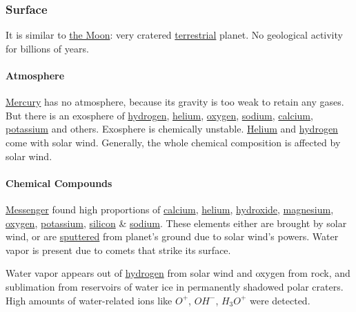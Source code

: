 \subsubsection{Surface}
It is similar to \hyperref[planet:earth:moon]{the Moon}: very cratered
\href{https://en.wikipedia.org/wiki/Terrestrial_planet}{terrestrial} planet. No
geological activity for billions of years.
\paragraph{Atmosphere}
\hyperref[planet:mercury]{Mercury} has no atmosphere, because its gravity is too
weak to retain any gases. But there is an exosphere of
\href{https://en.wikipedia.org/wiki/Hydrogen}{hydrogen},
\href{https://en.wikipedia.org/wiki/Helium}{helium},
\href{https://en.wikipedia.org/wiki/Oxygen}{oxygen},
\href{https://en.wikipedia.org/wiki/Sodium}{sodium},
\href{https://en.wikipedia.org/wiki/Calcium}{calcium},
\href{https://en.wikipedia.org/wiki/Potassium}{potassium} and others. Exosphere
is chemically unstable. \href{https://en.wikipedia.org/wiki/Helium}{Helium} and
\href{https://en.wikipedia.org/wiki/Hydrogen}{hydrogen} come with solar wind.
Generally, the whole chemical composition is affected by solar wind.
\paragraph{Chemical Compounds}
\hyperref[planet:mercury:spacecraft]{Messenger} found high proportions of
\href{https://en.wikipedia.org/wiki/Calcium}{calcium},
\href{https://en.wikipedia.org/wiki/Helium}{helium},
\href{https://en.wikipedia.org/wiki/Hydroxide}{hydroxide},
\href{https://en.wikipedia.org/wiki/Magnesium}{magnesium},
\href{https://en.wikipedia.org/wiki/Oxygen}{oxygen},
\href{https://en.wikipedia.org/wiki/Potassium}{potassium},
\href{https://en.wikipedia.org/wiki/Silicon}{silicon} \&
\href{https://en.wikipedia.org/wiki/Sodium}{sodium}. These elements either are
brought by solar wind, or are
\href{https://en.wikipedia.org/wiki/Silicon}{sputtered} from planet's ground
due to solar wind's powers. Water vapor is present due to comets that strike its
surface.

Water vapor appears out of
\href{https://en.wikipedia.org/wili/Hydrogen}{hydrogen} from solar wind and
oxygen from rock, and sublimation from reservoirs of water ice in permanently
shadowed polar craters. High amounts of water-related ions like $O^+$, $OH^-$,
\href{https://en.wikipedia.org/wiki/Hydronium}{$H_3O^+$} were detected.

